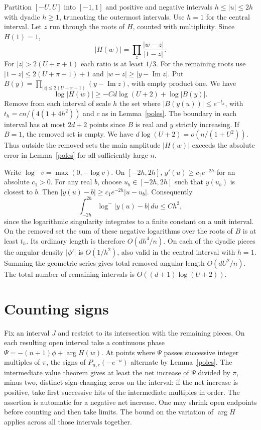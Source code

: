 \documentclass[11pt]{article}
\newcommand{\neglog}{\log^{-}}
\begin{document}
Partition $[-U,U]$ into $[-1,1]$ and positive and negative intervals $h\le |u|\le2h$ with dyadic $h\ge1$, truncating the outermost intervals. Use $h=1$ for the central interval. Let $z$ run through the roots of $H$, counted with multiplicity. Since $H(1)=1$,
\[
 |H(w)|=\prod_z\frac{|w-z|}{|1-z|} .
\]
For $|z|>2(U+\pi+1)$ each ratio is at least $1/3$. For the remaining roots use $|1-z|\le 2(U+\pi+1)+1$ and $|w-z|\ge|y-\operatorname{Im}z|$. Put $B(y)=\prod_{|z|\le2(U+\pi+1)}(y-\operatorname{Im}z)$, with empty product one. We have
\begin{equation}\label{prod}
 \log|H(w)|\ge -C d\log(U+2)+\log|B(y)| .
\end{equation}
Remove from each interval of scale $h$ the set where $|B(y(u))|\le e^{-t_h}$, with $t_h=cn/(4(1+4h^2))$ and $c$ as in Lemma~\ref{poles}. The boundary in each interval has at most $2d+2$ points since $B$ is real and $y$ strictly increasing. If $B=1$, the removed set is empty. We have $d\log(U+2)=o(n/(1+U^2))$. Thus outside the removed sets the main amplitude $|H(w)|$ exceeds the absolute error in Lemma~\ref{poles} for all sufficiently large $n$.

Write $\neglog v=\max(0,-\log v)$. On $[-2h,2h]$, $y'(u)\ge c_1 e^{-2h}$ for an absolute $c_1>0$. For any real $b$, choose $u_b\in[-2h,2h]$ such that $y(u_b)$ is closest to $b$. Then $|y(u)-b|\ge c_1e^{-2h}|u-u_b|$. Consequently
\[
 \int_{-2h}^{2h}\neglog|y(u)-b|\,du\le C h^2,
\]
since the logarithmic singularity integrates to a finite constant on a unit interval. On the removed set the sum of these negative logarithms over the roots of $B$ is at least $t_h$. Its ordinary length is therefore $O(d h^4/n)$. On each of the dyadic pieces the angular density $|\phi'|$ is $O(1/h^2)$, also valid in the central interval with $h=1$. Summing the geometric series gives total removed angular length $O(d U^2/n)$. The total number of remaining intervals is $O((d+1)\log(U+2))$.

\section{Counting signs}
Fix an interval $J$ and restrict to its intersection with the remaining pieces. On each resulting open interval take a continuous phase $\Psi=-(n+1)\phi+\arg H(w)$. At points where $\Psi$ passes successive integer multiples of $\pi$, the signs of $P_{n,r}(-e^{-u})$ alternate by Lemma~\ref{poles}. The intermediate value theorem gives at least the net increase of $\Psi$ divided by $\pi$, minus two, distinct sign-changing zeros on the interval: if the net increase is positive, take first successive hits of the intermediate multiples in order. The assertion is automatic for a negative net increase. One may shrink open endpoints before counting and then take limits. The bound on the variation of $\arg H$ applies across all those intervals together.
\end{document}
